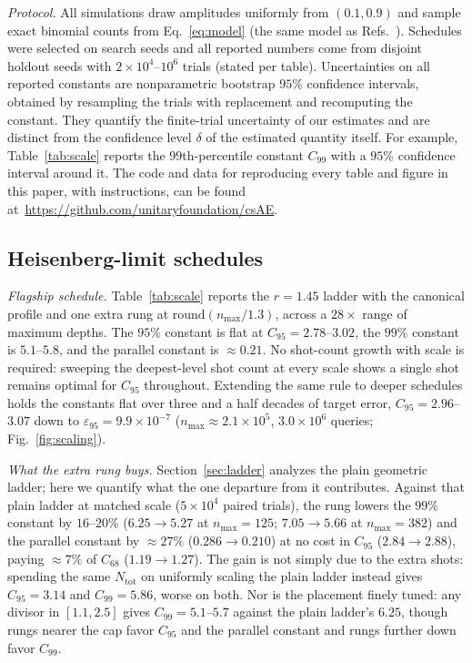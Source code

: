 \documentclass[%
 twocolumn,
 amsmath,amssymb,
prx,
longbibliography
]{revtex4-2}
\newcommand{\Ntot}{N_{\mathrm{tot}}}
\begin{document}
\emph{Protocol.} All simulations draw amplitudes uniformly from $(0.1, 0.9)$ and sample exact binomial counts from Eq.~\eqref{eq:model} (the same model as Refs.~\cite{suzuki2020amplitude, grinko2021iterative, labib2024csae}). Schedules were selected on search seeds and all reported numbers come from disjoint holdout seeds with $2\times 10^4$--$10^6$ trials (stated per table). Uncertainties on all reported constants are nonparametric bootstrap $95\%$ confidence intervals, obtained by resampling the trials with replacement and recomputing the constant. They quantify the finite-trial uncertainty of our estimates and are distinct from the confidence level $\delta$ of the estimated quantity itself. For example, Table~\ref{tab:scale} reports the $99$th-percentile constant $C_{99}$ with a $95\%$ confidence interval around it. The code and data for reproducing every table and figure in this paper, with instructions, can be found at~\href{https://github.com/unitaryfoundation/csAE}{https://github.com/unitaryfoundation/csAE}.

\subsection{Heisenberg-limit schedules}\label{subsec:heisenberg}

\emph{Flagship schedule.} Table~\ref{tab:scale} reports the $r = 1.45$ ladder with the canonical profile and one extra rung at $\mathrm{round}(n_{\max}/1.3)$, across a $28\times$ range of maximum depths. The $95\%$ constant is flat at $C_{95} = 2.78$--$3.02$, the $99\%$ constant is $5.1$--$5.8$, and the parallel constant is $\approx 0.21$. No shot-count growth with scale is required: sweeping the deepest-level shot count at every scale shows a single shot remains optimal for $C_{95}$ throughout. Extending the same rule to deeper schedules holds the constants flat over three and a half decades of target error, $C_{95} = 2.96$--$3.07$ down to $\varepsilon_{95} = 9.9\times 10^{-7}$ ($n_{\max} \approx 2.1\times 10^{5}$, $3.0\times 10^{6}$ queries; Fig.~\ref{fig:scaling}).

\emph{What the extra rung buys.} Section~\ref{sec:ladder} analyzes the plain geometric ladder; here we quantify what the one departure from it contributes. Against that plain ladder at matched scale ($5\times 10^4$ paired trials), the rung lowers the $99\%$ constant by $16$--$20\%$ ($6.25 \to 5.27$ at $n_{\max} = 125$; $7.05 \to 5.66$ at $n_{\max} = 382$) and the parallel constant by $\approx 27\%$ ($0.286 \to 0.210$) at no cost in $C_{95}$ ($2.84 \to 2.88$), paying $\approx 7\%$ of $C_{68}$ ($1.19 \to 1.27$). The gain is not simply due to the extra shots: spending the same $\Ntot$ on uniformly scaling the plain ladder instead gives $C_{95} = 3.14$ and $C_{99} = 5.86$, worse on both. Nor is the placement finely tuned: any divisor in $[1.1, 2.5]$ gives $C_{99} = 5.1$--$5.7$ against the plain ladder's $6.25$, though rungs nearer the cap favor $C_{95}$ and the parallel constant and rungs further down favor $C_{99}$.
\end{document}
